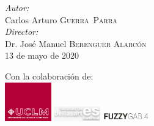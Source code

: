 \begin{titlepage}

\emph{Autor:}\\
Carlos Arturo \textsc{Guerra~Parra} %
\\[0.5cm]
\emph{Director:} \\
Dr. José Manuel \textsc{Berenguer Alarcón} %
\\[0.5cm]



{\large 13 de mayo de 2020} %


 

\vfill %

{\scriptsize Con la colaboración de:}\\[0.2cm]
\includegraphics[width=0.15\textwidth]{./portada/logoUCLM}
\includegraphics[width=0.15\textwidth]{./portada/logoBellasartes}
\includegraphics[width=0.15\textwidth]{./portada/logoFuzzyGab}

\end{titlepage}